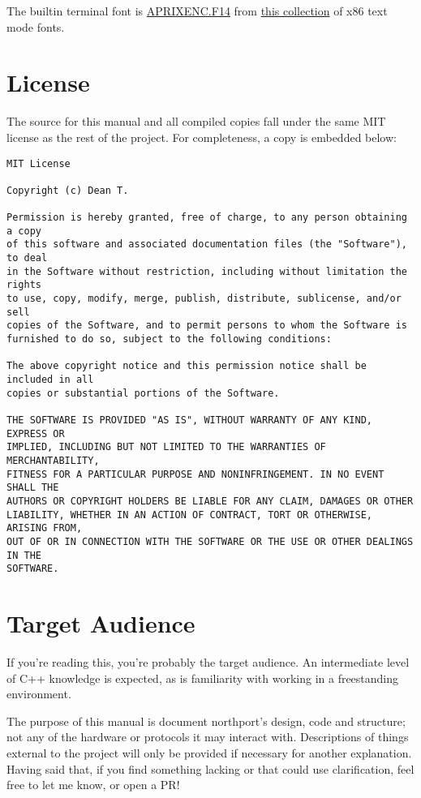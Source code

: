 The builtin terminal font is \href{https://github.com/viler-int10h/vga-text-mode-fonts/blob/master/FONTS/NON-PC/APRIXENC.F14}{APRIXENC.F14} from \href{https://github.com/viler-int10h/vga-text-mode-fonts}{this collection} of x86 text mode fonts.

\section{License}

The source for this manual and all compiled copies fall under the same MIT license as the rest of the project. For completeness, a copy is embedded below:

\begin{verbatim}
MIT License

Copyright (c) Dean T.

Permission is hereby granted, free of charge, to any person obtaining a copy
of this software and associated documentation files (the "Software"), to deal
in the Software without restriction, including without limitation the rights
to use, copy, modify, merge, publish, distribute, sublicense, and/or sell
copies of the Software, and to permit persons to whom the Software is
furnished to do so, subject to the following conditions:

The above copyright notice and this permission notice shall be included in all
copies or substantial portions of the Software.

THE SOFTWARE IS PROVIDED "AS IS", WITHOUT WARRANTY OF ANY KIND, EXPRESS OR
IMPLIED, INCLUDING BUT NOT LIMITED TO THE WARRANTIES OF MERCHANTABILITY,
FITNESS FOR A PARTICULAR PURPOSE AND NONINFRINGEMENT. IN NO EVENT SHALL THE
AUTHORS OR COPYRIGHT HOLDERS BE LIABLE FOR ANY CLAIM, DAMAGES OR OTHER
LIABILITY, WHETHER IN AN ACTION OF CONTRACT, TORT OR OTHERWISE, ARISING FROM,
OUT OF OR IN CONNECTION WITH THE SOFTWARE OR THE USE OR OTHER DEALINGS IN THE
SOFTWARE.
\end{verbatim}

\section{Target Audience}
If you're reading this, you're probably the target audience. An intermediate level of C++ knowledge is expected, as is familiarity with working in a freestanding environment.

The purpose of this manual is document northport's design, code and structure; not any of the hardware or protocols it may interact with. Descriptions of things external to the project will only be provided if necessary for another explanation.
Having said that, if you find something lacking or that could use clarification, feel free to let me know, or open a PR!

